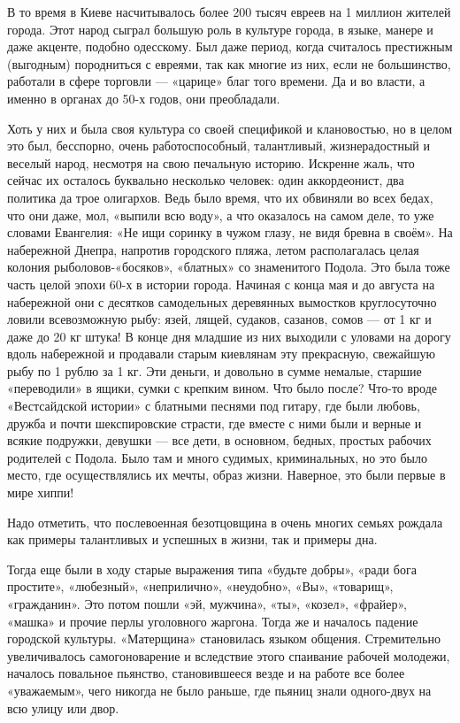 В то время в Киеве насчитывалось более 200 тысяч евреев на 1 миллион жителей
города. Этот народ сыграл большую роль в культуре города, в языке, манере и
даже акценте, подобно одесскому. Был даже период, когда считалось престижным
(выгодным) породниться с евреями, так как многие из них, если не большинство,
работали в сфере торговли --- «царице» благ того времени. Да и во власти, а
именно в органах до 50-х годов, они преобладали. 

Хоть у них и была своя культура со своей спецификой и клановостью, но в целом
это был, бесспорно, очень работоспособный, талантливый, жизнерадостный и
веселый народ, несмотря на свою печальную историю. Искренне жаль, что сейчас их
осталось буквально несколько человек: один аккордеонист, два политика да трое
олигархов. Ведь было время, что их обвиняли во всех бедах, что они даже, мол,
«выпили всю воду», а что оказалось на самом деле, то уже словами Евангелия: «Не
ищи соринку в чужом глазу, не видя бревна в своём».  На набережной Днепра,
напротив городского пляжа, летом располагалась целая колония
рыболовов-«босяков», «блатных» со знаменитого Подола. Это была тоже часть целой
эпохи 60-х в истории города. Начиная с конца мая и до августа на набережной они
с десятков самодельных деревянных вымостков круглосуточно ловили всевозможную
рыбу: язей, лящей, судаков, сазанов, сомов --- от 1 кг и даже до 20 кг штука! В
конце дня младшие из них выходили с уловами на дорогу вдоль набережной и
продавали старым киевлянам эту прекрасную, свежайшую рыбу по 1 рублю за 1 кг.
Эти деньги, и довольно в сумме немалые, старшие «переводили» в ящики, сумки с
крепким вином. Что было после? Что-то вроде «Вестсайдской истории» с блатными
песнями под гитару, где были любовь, дружба и почти шекспировские страсти, где
вместе с ними были и верные и всякие подружки, девушки --- все дети, в основном,
бедных, простых рабочих родителей с Подола. Было там и много судимых,
криминальных, но это было место, где осуществлялись их мечты, образ жизни.
Наверное, это были первые в мире хиппи! 

Надо отметить, что послевоенная безотцовщина в очень многих семьях рождала как
примеры талантливых и успешных в жизни, так и примеры дна.

Тогда еще были в ходу старые выражения типа «будьте добры», «ради бога
простите», «любезный», «неприлично», «неудобно», «Вы», «товарищ», «гражданин».
Это потом пошли «эй, мужчина», «ты», «козел», «фрайер», «машка» и прочие перлы
уголовного жаргона. Тогда же и началось падение городской культуры. «Матерщина»
становилась языком общения. Стремительно увеличивалось самогоноварение и
вследствие этого спаивание рабочей молодежи, началось повальное пьянство,
становившееся везде и на работе все более «уважаемым», чего никогда не было
раньше, где пьяниц знали одного-двух на всю улицу или двор. 

